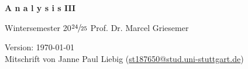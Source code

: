 	\begin{center}
		\vspace*{1cm}
		
		{\fontsize{40}{48} \textbf{A n a l y s i s \quad III}}
		
		\vspace{0.5cm}
		
		Wintersemester 20$\sfrac{24}{25}$ \quad Prof. Dr. Marcel Griesemer
		
		\vspace{1.0cm}
		Version: \today\\
		Mitschrift von Janne Paul Liebig (\href{mailto:st187650@stud.uni-stuttgart.de}{st187650@stud.uni-stuttgart.de})
		
	\end{center}